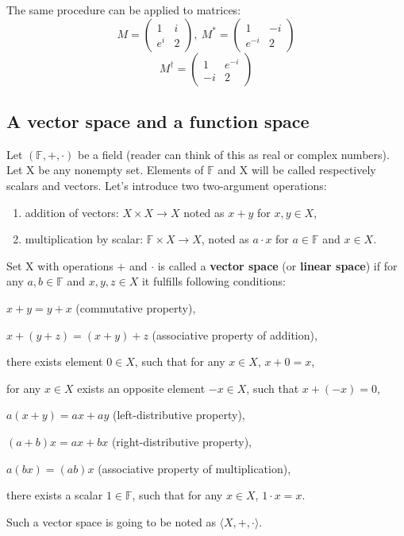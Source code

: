 \begin{example}
The same procedure can be applied to matrices:
\[ M = \begin{pmatrix} 1 & i \\ e^i & 2 \end{pmatrix}, \ M^* = \begin{pmatrix} 1 & -i \\ e^{-i} & 2 \end{pmatrix} \]
\[ M^\dagger = \begin{pmatrix} 1 & e^{-i} \\ -i & 2 \end{pmatrix} \]
\end{example}

\subsection{A vector space and a function space}

\begin{definition}
Let $(\mathbb{F}, +, \cdot)$ be a field (reader can think of this as real or complex numbers). Let X be any nonempty set. Elements of $\mathbb{F}$ and X will be called respectively scalars and vectors. Let's introduce two two-argument operations:
\begin{enumerate}
    \item addition of vectors: $X \times X \rightarrow X$ noted as $x + y$ for $x, y \in X$,
    \item multiplication by scalar: $\mathbb{F} \times X \rightarrow X$, noted as $a \cdot x$ for $a \in \mathbb{F}$ and $x \in X$.
\end{enumerate}
Set X with operations $+$ and $\cdot$ is called a \textbf{vector space} (or \textbf{linear space}) if for any $a,b \in \mathbb{F}$ and $x,y,z \in X$ it fulfills following conditions:
\begin{legal}
    \item $x + y = y + x$ (commutative property),
    \item $x + (y + z) = (x + y) + z$ (associative property of addition),
    \item there exists element $0 \in X$, such that for any $x \in X$, $x + 0 = x$,
    \item for any $x \in X$ exists an opposite element $-x \in X$, such that $x + (-x) = 0$,
    \item $a(x + y) = ax + ay$ (left-distributive property),
    \item $(a + b)x = ax + bx$ (right-distributive property),
    \item $a(bx) = (ab)x$ (associative property of multiplication),
    \item there exists a scalar $1 \in \mathbb{F}$, such that for any $x \in X$, $1 \cdot x = x$.
\end{legal}
Such a vector space is going to be noted as $\langle X, +, \cdot \rangle$.
\end{definition}

